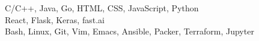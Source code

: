 
C/C++, Java, Go, HTML, CSS, JavaScript, Python\\
React, Flask, Keras, fast.ai\\
Bash, Linux, Git, Vim, Emacs, Ansible, Packer, Terraform, Jupyter\\
